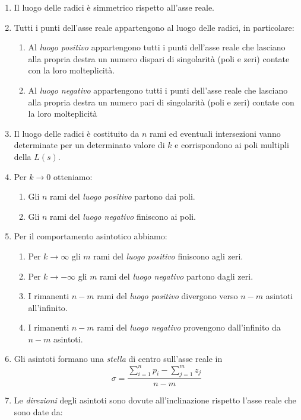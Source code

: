 \begin{enumerate}
	\item Il luogo delle radici è simmetrico rispetto all'asse reale.
	\item Tutti i punti dell'asse reale appartengono al luogo delle radici, in particolare:
	\begin{enumerate}
		\item Al \emph{luogo positivo} appartengono tutti i punti dell'asse reale che lasciano alla propria destra un numero dispari di singolarità (poli e zeri) contate con la loro molteplicità.
		\item Al \emph{luogo negativo} appartengono tutti i punti dell'asse reale che lasciano alla propria destra un numero pari di singolarità (poli e zeri) contate con la loro molteplicità 
	\end{enumerate}
	\item Il luogo delle radici è costituito da $n$ rami ed eventuali intersezioni vanno determinate per un determinato valore di $k$ e corrispondono ai poli multipli della $L(s)$.
	\item Per $k \rightarrow 0$ otteniamo:
	\begin{enumerate}
		\item Gli $n$ rami del \emph{luogo positivo} partono dai poli.
		\item Gli $n$ rami del \emph{luogo negativo} finiscono ai poli.
	\end{enumerate}
	\item Per il comportamento asintotico abbiamo:
	\begin{enumerate}
		\item Per $k \rightarrow \infty$ gli $m$ rami del \emph{luogo positivo} finiscono agli zeri.
		\item Per $k \rightarrow -\infty$ gli $m$ rami del \emph{luogo negativo} partono dagli zeri.
		\item I rimanenti $n-m$ rami del \emph{luogo positivo} divergono verso $n-m$ asintoti all'infinito.
		\item I rimanenti $n-m$ rami del \emph{luogo negativo} provengono dall'infinito da $n-m$ asintoti.
	\end{enumerate}
	\item Gli asintoti formano una \emph{stella} di centro sull'asse reale in 
		\begin{equation}
			\sigma = \frac{\sum_{i = 1}^{n}p_i - \sum_{j = 1}^{m}z_j}{n-m}
		\end{equation}
	\item Le \emph{direzioni} degli asintoti sono dovute all'inclinazione rispetto l'asse reale che sono date da:

\end{enumerate}
